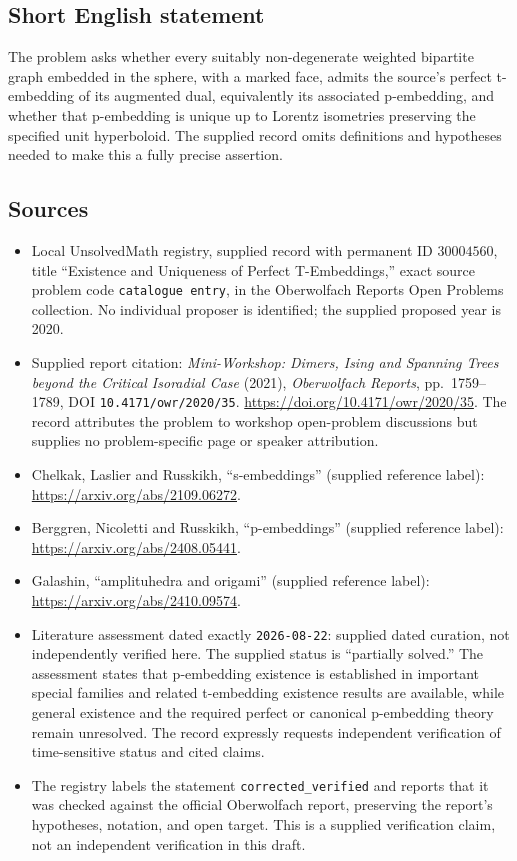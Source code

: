 \documentclass[11pt]{article}
\begin{document}
\subsection{Short English statement}
The problem asks whether every suitably non-degenerate weighted bipartite graph embedded in the sphere, with a marked face, admits the source's perfect t-embedding of its augmented dual, equivalently its associated p-embedding, and whether that p-embedding is unique up to Lorentz isometries preserving the specified unit hyperboloid. The supplied record omits definitions and hypotheses needed to make this a fully precise assertion.
\subsection{Sources}
\begin{itemize}
\item Local UnsolvedMath registry, supplied record with permanent ID \(30004560\), title ``Existence and Uniqueness of Perfect T-Embeddings,'' exact source problem code \texttt{catalogue entry}, in the Oberwolfach Reports Open Problems collection. No individual proposer is identified; the supplied proposed year is 2020.
\item Supplied report citation: \emph{Mini-Workshop: Dimers, Ising and Spanning Trees beyond the Critical Isoradial Case} (2021), \emph{Oberwolfach Reports}, pp.\ 1759--1789, DOI \texttt{10.4171/owr/2020/35}. \url{https://doi.org/10.4171/owr/2020/35}. The record attributes the problem to workshop open-problem discussions but supplies no problem-specific page or speaker attribution.
\item Chelkak, Laslier and Russkikh, ``s-embeddings'' (supplied reference label): \url{https://arxiv.org/abs/2109.06272}.
\item Berggren, Nicoletti and Russkikh, ``p-embeddings'' (supplied reference label): \url{https://arxiv.org/abs/2408.05441}.
\item Galashin, ``amplituhedra and origami'' (supplied reference label): \url{https://arxiv.org/abs/2410.09574}.
\item Literature assessment dated exactly \texttt{2026-08-22}: supplied dated curation, not independently verified here. The supplied status is ``partially solved.'' The assessment states that p-embedding existence is established in important special families and related t-embedding existence results are available, while general existence and the required perfect or canonical p-embedding theory remain unresolved. The record expressly requests independent verification of time-sensitive status and cited claims.
\item The registry labels the statement \texttt{corrected\_verified} and reports that it was checked against the official Oberwolfach report, preserving the report's hypotheses, notation, and open target. This is a supplied verification claim, not an independent verification in this draft.
\end{itemize}
\end{document}
